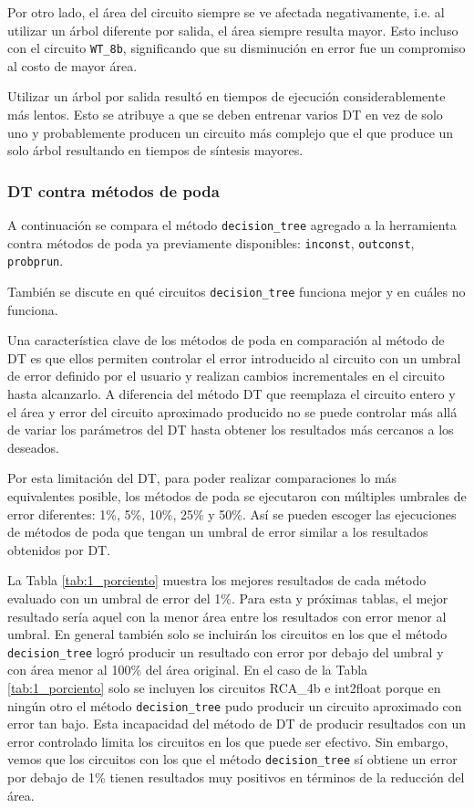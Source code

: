 Por otro lado, el área del circuito siempre se ve afectada negativamente, i.e.
al utilizar un árbol diferente por salida, el área siempre resulta mayor. Esto
incluso con el circuito \texttt{WT\_8b}, significando que su disminución en
error fue un compromiso al costo de mayor área.


Utilizar un árbol por salida resultó en tiempos de ejecución considerablemente
más lentos. Esto se atribuye a que se deben entrenar varios DT en vez de solo
uno y probablemente producen un circuito más complejo que el que produce un
solo árbol resultando en tiempos de síntesis mayores.

\subsubsection{DT contra métodos de poda}

A continuación se compara el método \texttt{decision\_tree} agregado a la
herramienta contra métodos de poda ya previamente disponibles:
\texttt{inconst}, \texttt{outconst}, \texttt{probprun}.

También se discute en qué circuitos \texttt{decision\_tree} funciona mejor y en
cuáles no funciona.

Una característica clave de los métodos de poda en comparación al método de DT
es que ellos permiten controlar el error introducido al circuito con un umbral
de error definido por el usuario y realizan cambios incrementales en el
circuito hasta alcanzarlo. A diferencia del método DT que reemplaza el circuito
entero y el área y error del circuito aproximado producido no se puede
controlar más allá de variar los parámetros del DT hasta obtener los resultados
más cercanos a los deseados.

Por esta limitación del DT, para poder realizar comparaciones lo más
equivalentes posible, los métodos de poda se ejecutaron con múltiples umbrales
de error diferentes: \num{1}\%, \num{5}\%, \num{10}\%, \num{25}\% y \num{50}\%.
Así se pueden escoger las ejecuciones de métodos de poda que tengan un umbral de
error similar a los resultados obtenidos por DT.

La Tabla \ref{tab:1_porciento} muestra los mejores resultados de cada método
evaluado con un umbral de error del 1\%. Para esta y próximas tablas, el mejor
resultado sería aquel con la menor área entre los resultados con error menor al
umbral. En general también solo se incluirán los circuitos en los que el método
\texttt{decision\_tree} logró producir un resultado con error por debajo del
umbral y con área menor al 100\% del área original. En el caso de la Tabla
\ref{tab:1_porciento} solo se incluyen los circuitos RCA\_4b e int2float porque
en ningún otro el método \texttt{decision\_tree} pudo producir un circuito
aproximado con error tan bajo. Esta incapacidad del método de DT de producir
resultados con un error controlado limita los circuitos en los que puede ser
efectivo. Sin embargo, vemos que los circuitos con los que el método
\texttt{decision\_tree} sí obtiene un error por debajo de 1\% tienen resultados
muy positivos en términos de la reducción del área.

